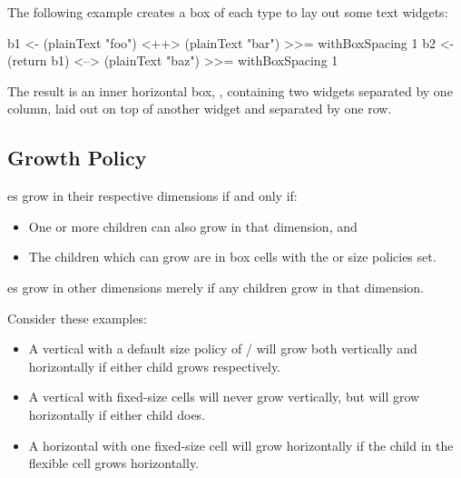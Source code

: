 The following example creates a box of each type to lay out some text
widgets:

\begin{haskellcode}
 b1 <- (plainText "foo") <++> (plainText "bar") >>= withBoxSpacing 1
 b2 <- (return b1) <--> (plainText "baz") >>= withBoxSpacing 1
\end{haskellcode}

The result is an inner horizontal box, , containing two
 widgets separated by one column, laid out on top of
another  widget and separated by one row.

\subsection{Growth Policy}

es grow in their respective dimensions if and only if:

\begin{itemize}
\item One or more children can also grow in that dimension, and
\item The children which can grow are in box cells with the
   or  size policies set.
\end{itemize}

es grow in other dimensions merely if any children grow in
that dimension.

Consider these examples:

\begin{itemize}
\item A vertical  with a default size policy of  /
   will grow both vertically and horizontally if either
  child grows respectively.
\item A vertical  with fixed-size cells will never grow
  vertically, but will grow horizontally if either child does.
\item A horizontal  with one fixed-size cell will grow
  horizontally if the child in the flexible cell grows horizontally.
\end{itemize}
